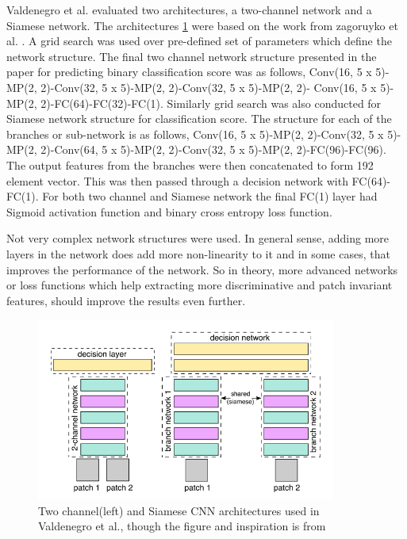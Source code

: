 Valdenegro et al. \cite{stateoftheart} evaluated two architectures, a two-channel network and a Siamese network. The architectures \ref{fig:two_channel_only_siamese} were based on the work from zagoruyko et al. \cite{zagoruyko2015learning}.
A grid search was used over pre-defined set of parameters which define the network structure. The final two channel network structure presented in the paper for predicting binary classification score was as follows,
Conv(16, 5 x 5)-MP(2, 2)-Conv(32, 5 x 5)-MP(2, 2)-Conv(32, 5 x 5)-MP(2, 2)- Conv(16, 5 x 5)-MP(2, 2)-FC(64)-FC(32)-FC(1). Similarly grid search was also conducted for Siamese network structure for classification score. The structure for each 
of the branches or sub-network is as follows, Conv(16, 5 x 5)-MP(2, 2)-Conv(32, 5 x 5)- MP(2, 2)-Conv(64, 5 x 5)-MP(2, 2)-Conv(32, 5 x 5)-MP(2, 2)-FC(96)-FC(96). The output features from the branches were then concatenated to form 192 
element vector. This was then passed through a decision network with FC(64)-FC(1). For both two channel and Siamese network the final FC(1) layer had Sigmoid \cite{kerassigmoid} activation function and binary cross entropy loss\cite{kerascrossentropy}
function. 

Not very complex network structures were used. In general sense, adding more layers in the network does add more non-linearity to it and in some cases, that improves the performance of the network. So in theory, more advanced networks or loss 
functions which help extracting more discriminative and patch invariant features, should improve the results even further.

\begin{figure}[ht]
\centering
\includegraphics[height=6cm]{images/densenet/two_channel_only_siamese.png}
\caption{Two channel(left) and Siamese CNN architectures used in Valdenegro et al., though the figure and inspiration is from \cite{zagoruyko2015learning}}
\label{fig:two_channel_only_siamese}
\end{figure}
